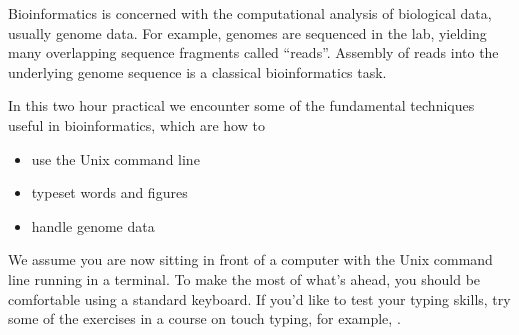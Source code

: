 Bioinformatics is concerned with the computational analysis of
biological data, usually genome data. For example, genomes are
sequenced in the lab, yielding many overlapping sequence fragments
called ``reads''. Assembly of reads into the underlying genome
sequence is a classical bioinformatics task.

In this two hour practical we encounter some of the fundamental
techniques useful in bioinformatics, which are how to
\begin{itemize}
\item use the Unix command line
\item typeset words and figures
\item handle genome data
\end{itemize}
We assume you are now sitting in front of a computer with the Unix
command line running in a terminal. To make the most of what's ahead,
you should be comfortable using a standard keyboard. If you'd like to
test your typing skills, try some of the exercises in a course on
touch typing, for example, .
